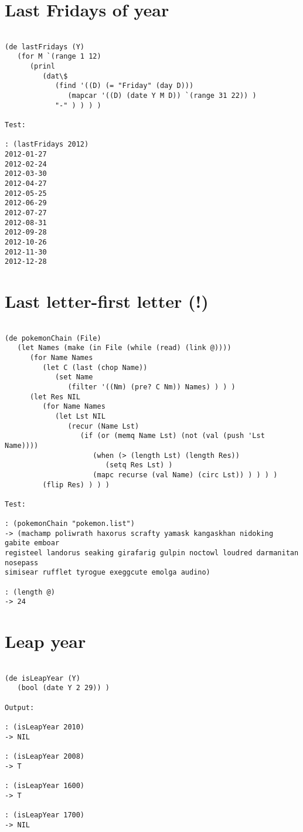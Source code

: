 \section*{Last Fridays of year}

\begin{verbatim}

(de lastFridays (Y)
   (for M `(range 1 12)
      (prinl
         (dat\$
            (find '((D) (= "Friday" (day D)))
               (mapcar '((D) (date Y M D)) `(range 31 22)) )
            "-" ) ) ) )

Test:

: (lastFridays 2012)
2012-01-27
2012-02-24
2012-03-30
2012-04-27
2012-05-25
2012-06-29
2012-07-27
2012-08-31
2012-09-28
2012-10-26
2012-11-30
2012-12-28

\end{verbatim}

\section*{Last letter-first letter (!)}

\begin{verbatim}

(de pokemonChain (File)
   (let Names (make (in File (while (read) (link @))))
      (for Name Names
         (let C (last (chop Name))
            (set Name
               (filter '((Nm) (pre? C Nm)) Names) ) ) )
      (let Res NIL
         (for Name Names
            (let Lst NIL
               (recur (Name Lst)
                  (if (or (memq Name Lst) (not (val (push 'Lst Name))))
                     (when (> (length Lst) (length Res))
                        (setq Res Lst) )
                     (mapc recurse (val Name) (circ Lst)) ) ) ) )
         (flip Res) ) ) )

Test:

: (pokemonChain "pokemon.list")
-> (machamp poliwrath haxorus scrafty yamask kangaskhan nidoking gabite emboar
registeel landorus seaking girafarig gulpin noctowl loudred darmanitan nosepass
simisear rufflet tyrogue exeggcute emolga audino)

: (length @)
-> 24

\end{verbatim}

\section*{Leap year}

\begin{verbatim}

(de isLeapYear (Y)
   (bool (date Y 2 29)) )

Output:

: (isLeapYear 2010)
-> NIL

: (isLeapYear 2008)
-> T

: (isLeapYear 1600)
-> T

: (isLeapYear 1700)
-> NIL

\end{verbatim}

